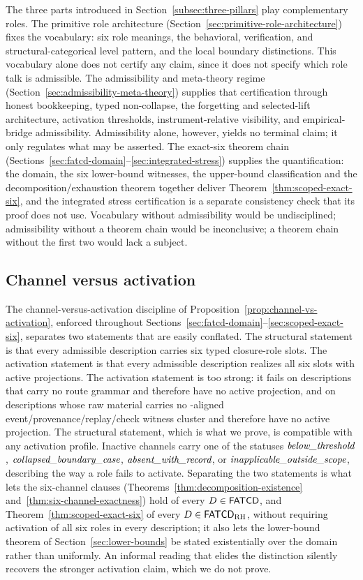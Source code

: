 The three parts introduced in Section~\ref{subsec:three-pillars} play
complementary roles. The primitive role architecture
(Section~\ref{sec:primitive-role-architecture}) fixes the vocabulary:
six role meanings, the behavioral, verification, and
structural-categorical level pattern, and the local boundary
distinctions. This vocabulary alone does not certify any claim,
since it does not specify which role talk is admissible. The
admissibility and meta-theory regime
(Section~\ref{sec:admissibility-meta-theory}) supplies that
certification through honest bookkeeping, typed non-collapse, the
forgetting and selected-lift architecture, activation thresholds,
instrument-relative visibility, and empirical-bridge admissibility.
Admissibility alone, however, yields no terminal claim; it only
regulates what may be asserted. The exact-six theorem chain
(Sections~\ref{sec:fatcd-domain}--\ref{sec:integrated-stress})
supplies the quantification: the \FATCD{} domain, the six
lower-bound witnesses, the upper-bound classification and the
decomposition/exhaustion theorem together deliver
Theorem~\ref{thm:scoped-exact-six}, and the integrated stress certification
is a separate consistency check that its proof does not use.
Vocabulary without admissibility would be undisciplined; admissibility
without a theorem chain would be inconclusive; a theorem chain without
the first two would lack a subject.

\subsection{Channel versus activation}\label{subsec:discussion-channel-vs-activation}

The channel-versus-activation discipline of
Proposition~\ref{prop:channel-vs-activation}, enforced throughout
Sections~\ref{sec:fatcd-domain}--\ref{sec:scoped-exact-six},
separates two statements that are easily conflated. The structural
statement is that every admissible description carries six typed
closure-role slots. The activation statement is that every admissible
description realizes all six slots with active projections. The
activation statement is too strong: it fails on descriptions that
carry no route grammar and therefore have no active \Pthree{}
projection, and on descriptions whose raw material carries no
\Psix{}-aligned event/provenance/replay/check witness cluster and
therefore have no active \Psix{} projection. The structural
statement, which is what we prove, is compatible with any activation
profile. Inactive channels carry one of the statuses
\(\textit{below\_\allowbreak threshold}{}\), \(\textit{collapsed\_\allowbreak boundary\_\allowbreak case}{}\), \(\textit{absent\_\allowbreak with\_\allowbreak record}{}\), or
\(\textit{inapplicable\_\allowbreak outside\_\allowbreak scope}{}\), describing the way a role fails to activate.
Separating the two statements is what lets the six-channel clauses
(Theorems~\ref{thm:decomposition-existence}
and~\ref{thm:six-channel-exactness}) hold of every \(D \in \mathsf{FATCD}{}\), and
Theorem~\ref{thm:scoped-exact-six} of every \(D\in\mathsf{FATCD}_{\mathrm{RH}}\),
without requiring activation of all six roles in every description; it also lets the lower-bound theorem of
Section~\ref{sec:lower-bounds} be stated existentially over the
domain rather than uniformly. An informal reading that elides the
distinction silently recovers the stronger activation claim, which we
do not prove.

